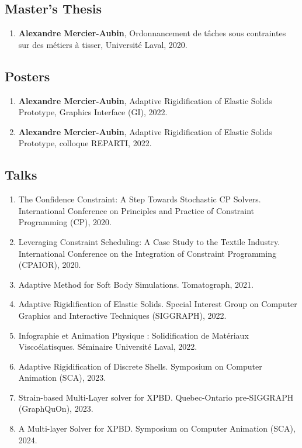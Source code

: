 \documentclass[10pt]{article} %
\begin{document}
\subsection{Master's Thesis}
\begin{enumerate}
  \setcounter{enumi}{\value{listCounter}}
  \item \textbf{Alexandre Mercier-Aubin}, Ordonnancement de tâches sous contraintes sur des métiers à tisser, Université Laval, 2020. 
\end{enumerate}

\subsection{Posters}
\begin{enumerate}
  \setcounter{enumi}{\value{listCounter}}
  \item \textbf{Alexandre Mercier-Aubin}, Adaptive Rigidification of Elastic Solids Prototype, Graphics Interface (GI), 2022. 
  \item \textbf{Alexandre Mercier-Aubin}, Adaptive Rigidification of Elastic Solids Prototype, colloque REPARTI, 2022. 
\end{enumerate}

\subsection{Talks}
\begin{enumerate}
  \setcounter{enumi}{\value{listCounter}}
  \item The Confidence Constraint: A Step Towards Stochastic CP Solvers. International Conference on Principles and Practice of Constraint Programming (CP), 2020.
  \item  Leveraging Constraint Scheduling: A Case Study to the Textile Industry. International Conference on the Integration of Constraint Programming (CPAIOR), 2020.
  \item Adaptive Method for Soft Body Simulations. Tomatograph, 2021.
  \item Adaptive Rigidification of Elastic Solids. Special Interest Group on Computer Graphics and Interactive Techniques (SIGGRAPH), 2022. 
  \item Infographie et Animation Physique : Solidification de Matériaux Viscoélatisques.  Séminaire Université Laval, 2022.
  \item Adaptive Rigidification of Discrete Shells. Symposium on Computer Animation (SCA), 2023. 
  \item Strain-based Multi-Layer solver for XPBD. Quebec-Ontario pre-SIGGRAPH (GraphQuOn), 2023.
  \item A Multi-layer Solver for XPBD. Symposium on Computer Animation (SCA), 2024. 
\end{enumerate}
\end{document}
